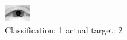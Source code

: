 \begin{figure}[h!]
\begin{center}
\includegraphics[width=0.60\columnwidth]{figures/ID2266_class_1_target_2.png}
\end{center}
\caption{ Classification: 1 actual target: 2}
\label{fig:ID2266_class_1_target_2}
\end{figure}
